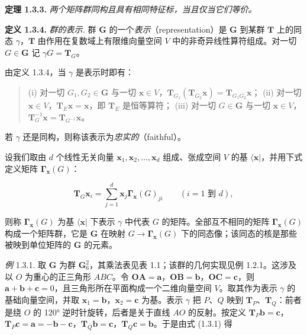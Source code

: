 \textbf{定理 1.3.3.} \textit{两个矩阵群同构且具有相同特征标，当且仅当它们等价。}

\textbf{定义 1.3.4.} \textit{群的表示.} 群 $\mathbf{G}$ 的一个\textit{表示}（representation）是 $\mathbf{G}$ 到某群 $\mathbf{T}$ 上的同态 $\gamma$，$\mathbf{T}$ 由作用在复数域上有限维向量空间 $V$ 中的非奇异线性算符组成。对一切 $G \in \mathbf{G}$ 记 $\gamma G = \mathbf{T}_{G}$。

由定义 1.3.4，当 $\gamma$ 是表示时即有：

\begin{quote}
(i) 对一切 $G_{1}, G_{2} \in \mathbf{G}$ 与一切 $\mathbf{x} \in V$，$\mathbf{T}_{G_{1}}(\mathbf{T}_{G_{2}}\mathbf{x}) = \mathbf{T}_{G_{1}G_{2}}\mathbf{x}$；
(ii) 对一切 $\mathbf{x} \in V$，$\mathbf{T}_{E}\mathbf{x} = \mathbf{x}$，即 $\mathbf{T}_{E}$ 是恒等算符；
(iii) 对一切 $G \in \mathbf{G}$ 与一切 $\mathbf{x} \in V$，$\mathbf{T}_{G}^{-1}\mathbf{x} = \mathbf{T}_{G^{-1}}\mathbf{x}$。
\end{quote}

若 $\gamma$ 还是同构，则称该表示为\textit{忠实的}（faithful）。

设我们取由 $d$ 个线性无关向量 $\mathbf{x}_{1}, \mathbf{x}_{2}, \ldots, \mathbf{x}_{d}$ 组成、张成空间 $V$ 的基 $\langle \mathbf{x}|$，并用下式定义矩阵 $\mathbf{\Gamma}_{\mathbf{x}}(G)$：

\begin{equation*}
\mathbf{T}_{G}\mathbf{x}_{i} = \sum_{j=1}^{d} \mathbf{x}_{j}\mathbf{\Gamma}_{\mathbf{x}}(G)_{ji} \qquad (i = 1 \text{ 到 } d),
\tag{1.3.1}
\end{equation*}

则称 $\mathbf{\Gamma}_{\mathbf{x}}(G)$ 为基 $\langle \mathbf{x}|$ 下表示 $\gamma$ 中代表 $G$ 的矩阵。全部互不相同的矩阵 $\mathbf{\Gamma}_{\mathbf{x}}(G)$ 构成一个矩阵群，它是 $\mathbf{G}$ 在映射 $G \rightarrow \mathbf{\Gamma}_{\mathbf{x}}(G)$ 下的同态像；该同态的核是那些被映到单位矩阵的 $\mathbf{G}$ 的元素。

\textit{例} 1.3.1. 取 $\mathbf{G}$ 为群 $\mathbf{G}_6^2$，其乘法表见表 1.1；该群的几何实现见例 1.2.1。这涉及以 $O$ 为重心的正三角形 $ABC$。令 $\mathbf{OA} = \mathbf{a}$，$\mathbf{OB} = \mathbf{b}$，$\mathbf{OC} = \mathbf{c}$，则 $\mathbf{a} + \mathbf{b} + \mathbf{c} = 0$，且三角形所在平面构成一个二维向量空间 $V$。取其作为表示 $\gamma$ 的基础向量空间，并取 $\mathbf{x}_{1} = \mathbf{b}$，$\mathbf{x}_{2} = \mathbf{c}$ 为基。表示 $\gamma$ 把 $P$、$Q$ 映到 $\mathbf{T}_{P}$、$\mathbf{T}_{Q}$：前者是绕 $O$ 的 120° 逆时针旋转，后者是关于直线 $AO$ 的反射。按定义 $\mathbf{T}_{P}\mathbf{b} = \mathbf{c}$，$\mathbf{T}_{P}\mathbf{c} = \mathbf{a} = -\mathbf{b}-\mathbf{c}$，$\mathbf{T}_{Q}\mathbf{b} = \mathbf{c}$，$\mathbf{T}_{Q}\mathbf{c} = \mathbf{b}$。于是由式 (1.3.1) 得

